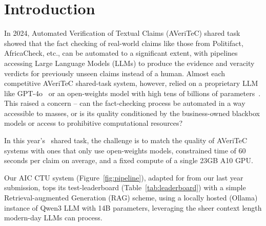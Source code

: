 


\section{Introduction}
\label{sec:introduction}
In 2024, Automated Verification of Textual Claims (AVeriTeC) shared task~\cite{schlichtkrull-etal-2024-automated} showed that the fact checking of real-world claims like those from Politifact, AfricaCheck, etc., can be automated to a significant extent, with pipelines accessing Large Language Models (LLMs) to produce the evidence and veracity verdicts for previously unseen claims instead of a human.
Almost each competitive AVeriTeC shared-task system, however, relied on a proprietary LLM like GPT-4o~\cite{rothermel-etal-2024-infact,ullrich-etal-2024-aic} or an open-weights model with high tens of billions of parameters~\cite{yoon-etal-2024-hero}.
This raised a concern -- can the fact-checking process be automated in a way accessible to masses, or is its quality conditioned by the business-owned blackbox models or access to prohibitive computational resources?

In this year's~\averitec{} shared task, the challenge is to match the quality of AVeriTeC systems with ones that only use open-weights models, constrained time of 60 seconds per claim on average, and a fixed compute of a single 23GB A10 GPU.

Our AIC CTU system (Figure~\ref{fig:pipeline}), adapted for \averitec{} from our last year submission, tops its test-leaderboard (Table~\ref{tab:leaderboard}) with a simple Retrieval-augmented Generation (RAG) scheme, using a locally hosted (Ollama) instance of Qwen3 LLM with 14B parameters, leveraging the sheer context length modern-day LLMs can process.

